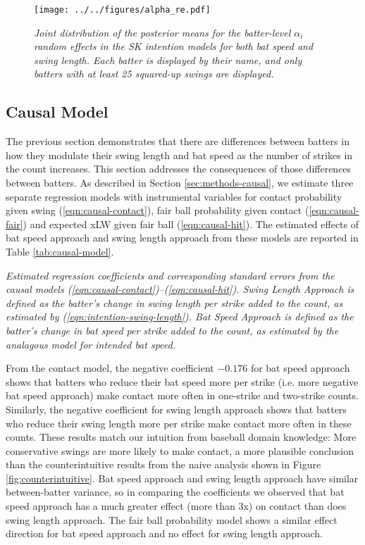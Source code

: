 \documentclass[
  12pt]{article}
\begin{document}
      \begin{figure}[H]
        \centering
        \texttt{[image: ../../figures/alpha\_re.pdf]}
        \caption{\it Joint distribution of the posterior means for the batter-level $\alpha_i$ random effects in the SK intention models for both bat speed and swing length. Each batter is displayed by their name, and only batters with at least 25 squared-up swings are displayed.}
        \label{fig:alpha-re}
      \end{figure}
      
    \subsection{Causal Model}
    \label{sec:results-causal}

      The previous section demonstrates that there are differences between batters in how they modulate their swing length and bat speed as the number of strikes in the count increases. This section addresses the consequences of those differences between batters. As described in Section \ref{sec:methods-causal}, we estimate three separate regression models with instrumental variables for contact probability given swing (\ref{eqn:causal-contact}), fair ball probability given contact (\ref{eqn:causal-fair}) and expected xLW given fair ball (\ref{eqn:causal-hit}). The estimated effects of bat speed approach and swing length approach from these models are reported in Table \ref{tab:causal-model}.

      \begin{table}[H]
        \centering
        
        \caption{\it Estimated regression coefficients and corresponding standard errors from the causal models (\ref{eqn:causal-contact})--(\ref{eqn:causal-hit}). Swing Length Approach is defined as the batter's change in swing length per strike added to the count, as estimated by (\ref{eqn:intention-swing-length}). Bat Speed Approach is defined as the batter's change in bat speed per strike added to the count, as estimated by the analagous model for intended bat speed.}
        \label{tab:causal-model}
      \end{table}

      From the contact model, the negative coefficient $-0.176$ for bat speed approach shows that batters who reduce their bat speed more per strike (i.e. more negative bat speed approach) make contact more often in one-strike and two-strike counts. Similarly, the negative coefficient for swing length approach shows that batters who reduce their swing length more per strike make contact more often in these counts. These results match our intuition from baseball domain knowledge: More conservative swings are more likely to make contact, a more plausible conclusion than the counterintuitive results from the naive analysis shown in Figure \ref{fig:counterintuitive}. Bat speed approach and swing length approach have similar between-batter variance, so in comparing the coefficients we observed that bat speed approach has a much greater effect (more than 3x) on contact than does swing length approach. The fair ball probability model shows a similar effect direction for bat speed approach and no effect for swing length approach.
\end{document}
